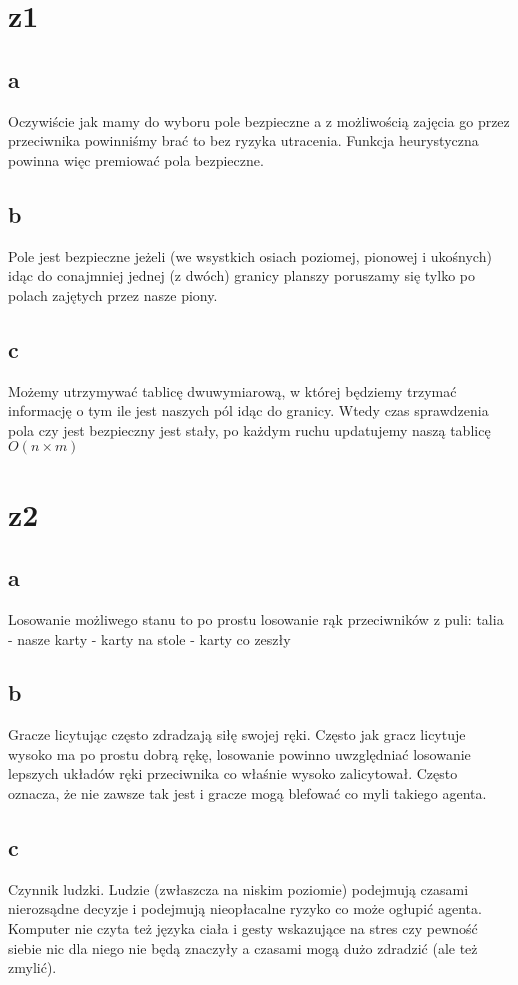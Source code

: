 \documentclass{article}
\title{}
\date{26.05.2020}
\author{Maurycy Borkowski}
\begin{document}
\maketitle

\section{z1}
\subsection*{a}
Oczywiście jak mamy do wyboru pole bezpieczne a z możliwością zajęcia go przez przeciwnika powinniśmy brać to bez ryzyka utracenia. Funkcja heurystyczna powinna więc premiować pola bezpieczne.
\subsection*{b}
Pole jest bezpieczne jeżeli (we wsystkich osiach poziomej, pionowej i ukośnych) idąc do conajmniej jednej (z dwóch) granicy planszy poruszamy się tylko po polach zajętych przez nasze piony.
\subsection*{c}
Możemy utrzymywać tablicę dwuwymiarową, w której będziemy trzymać informację o tym ile jest naszych pól idąc do granicy. Wtedy czas sprawdzenia pola czy jest bezpieczny jest stały, po każdym ruchu updatujemy naszą tablicę $O(n \times m)$
\section{z2}
\subsection*{a}
Losowanie możliwego stanu to po prostu losowanie rąk przeciwników z puli: talia - nasze karty - karty na stole - karty co zeszły
\subsection*{b}
Gracze licytując często zdradzają siłę swojej ręki. Często jak gracz licytuje wysoko ma po prostu dobrą rękę, losowanie powinno uwzględniać losowanie lepszych układów ręki przeciwnika co właśnie wysoko zalicytował. Często oznacza, że nie zawsze tak jest i gracze mogą blefować co myli takiego agenta.
\subsection*{c}
Czynnik ludzki. Ludzie (zwłaszcza na niskim poziomie) podejmują czasami nierozsądne decyzje i podejmują nieopłacalne ryzyko co może ogłupić agenta. Komputer nie czyta też języka ciała i gesty wskazujące na stres czy pewność siebie nic dla niego nie będą znaczyły a czasami mogą dużo zdradzić (ale też zmylić).
\end{document}
